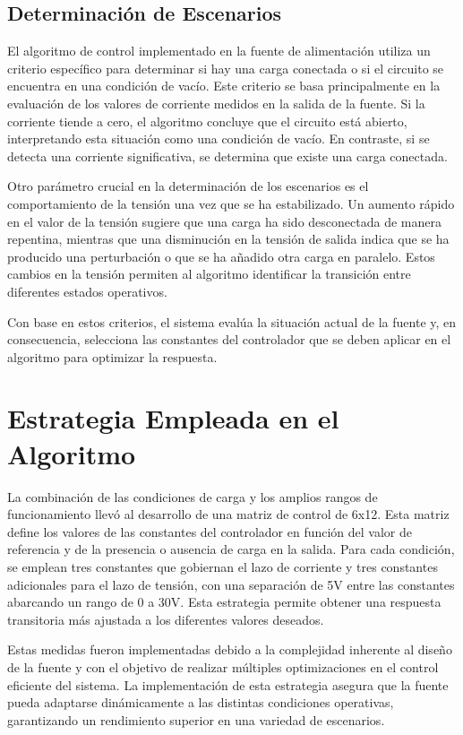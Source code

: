\subsection{Determinación de Escenarios}
El algoritmo de control implementado en la fuente de alimentación utiliza un criterio específico para determinar si hay una carga conectada o si el circuito se encuentra en una condición de vacío. Este criterio se basa principalmente en la evaluación de los valores de corriente medidos en la salida de la fuente. Si la corriente tiende a cero, el algoritmo concluye que el circuito está abierto, interpretando esta situación como una condición de vacío. En contraste, si se detecta una corriente significativa, se determina que existe una carga conectada.\par
Otro parámetro crucial en la determinación de los escenarios es el comportamiento de la tensión una vez que se ha estabilizado. Un aumento rápido en el valor de la tensión sugiere que una carga ha sido desconectada de manera repentina, mientras que una disminución en la tensión de salida indica que se ha producido una perturbación o que se ha añadido otra carga en paralelo. Estos cambios en la tensión permiten al algoritmo identificar la transición entre diferentes estados operativos.\par
Con base en estos criterios, el sistema evalúa la situación actual de la fuente y, en consecuencia, selecciona las constantes del controlador que se deben aplicar en el algoritmo para optimizar la respuesta.\par

\section{Estrategia Empleada en el Algoritmo}
La combinación de las condiciones de carga y los amplios rangos de funcionamiento llevó al desarrollo de una matriz de control de 6x12. Esta matriz define los valores de las constantes del controlador en función del valor de referencia y de la presencia o ausencia de carga en la salida. Para cada condición, se emplean tres constantes que gobiernan el lazo de corriente y tres constantes adicionales para el lazo de tensión, con una separación de 5V entre las constantes abarcando un rango de 0 a 30V. Esta estrategia permite obtener una respuesta transitoria más ajustada a los diferentes valores deseados.\par
Estas medidas fueron implementadas debido a la complejidad inherente al diseño de la fuente y con el objetivo de realizar múltiples optimizaciones en el control eficiente del sistema. La implementación de esta estrategia asegura que la fuente pueda adaptarse dinámicamente a las distintas condiciones operativas, garantizando un rendimiento superior en una variedad de escenarios.\par

